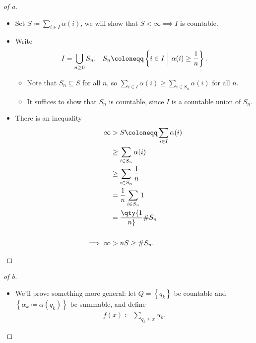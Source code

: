 \begin{solution}

\envlist

\begin{proof}[of a]

\envlist

\begin{itemize}
\tightlist
\item
  Set \(S \coloneqq\sum_{i\in I} \alpha(i)\), we will show that
  \(S<\infty \implies I\) is countable.
\item
  Write
  \begin{align*}
  I = \displaystyle\bigcup_{n\geq 0} S_n, &&
  S_n \coloneqq\left\{{i\in I {~\mathrel{\Big|}~}\alpha(i) \geq {1\over n}}\right\}
  .\end{align*}

  \begin{itemize}
  \tightlist
  \item
    Note that \(S_n \subseteq S\) for all \(n\), so
    \(\sum_{i\in I}\alpha(i) \geq \sum_{i\in S_n} \alpha(i)\) for all
    \(n\).
  \item
    It suffices to show that \(S_n\) is countable, since \(I\) is a
    countable union of \(S_n\).
  \end{itemize}
\item
  There is an inequality
  \begin{align*}  
  \infty 
  &> S \coloneqq\sum_{i\in I} \alpha(i) \\
  &\geq \sum_{i\in S_n} \alpha(i) \\
  &\geq \sum_{i\in S_n} {1\over n} \\
  &= {1\over n} \sum_{i\in S_n} 1 \\
  &= \qty{1\over n} \# S_n \\ \\
  \implies \infty &> n S \geq \# S_n
  .\end{align*}
\end{itemize}

\end{proof}

\begin{proof}[of b]

\envlist

\begin{itemize}
\item
  We'll prove something more general: let \(Q = \left\{{q_k}\right\}\)
  be countable and \(\left\{{\alpha_k \coloneqq\alpha(q_k)}\right\}\) be
  summable, and define
  \begin{align*}
  f(x) \coloneqq\sum_{q_k\leq x} \alpha_k
  .\end{align*}


\end{itemize}
\end{proof}
\end{solution}

